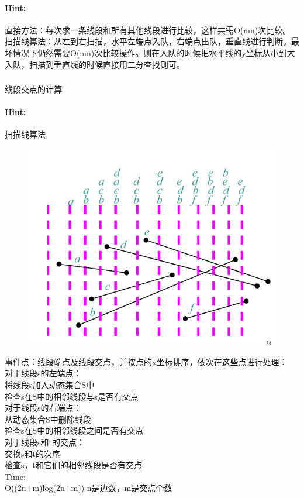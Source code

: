 \documentclass{article}
\begin{document}
     \paragraph{Hint:}直接方法：每次求一条线段和所有其他线段进行比较，这样共需O(mn)次比较。\\
     扫描线算法：从左到右扫描，水平左端点入队，右端点出队，垂直线进行判断。最坏情况下仍然需要O(mn)次比较操作。则在入队的时候把水平线的y坐标从小到大入队，扫描到垂直线的时候直接用二分查找则可。
     
     \subsubsection{}线段交点的计算
     \paragraph{Hint:}扫描线算法
        \begin{figure}[h]
 	\centering
 	\includegraphics[scale=0.6]{scan.png}
    \end{figure}
    事件点：线段端点及线段交点，并按点的x坐标排序，依次在这些点进行处理：\\
    对于线段s的左端点：\\
    将线段s加入动态集合S中\\
    检查s在S中的相邻线段与s是否有交点\\
    对于线段s的右端点：\\
    从动态集合S中删除线段\\
    检查s在S中的相邻线段之间是否有交点\\
    对于线段s和t的交点：\\
    交换s和t的次序\\
    检查s，t和它们的相邻线段是否有交点 \\
     Time:\\
    O((2n+m)log(2n+m)) n是边数，m是交点个数
    
\end{document}
